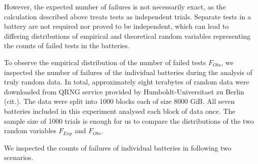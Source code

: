 \documentclass[
  digital,  	%
  color,		%
  oneside,   	%
  12pt,
  nocover,
  notable,
  nolof,
  nolot,
]{fithesis3}
\theoremstyle{definition}
\theoremstyle{remark}
\begin{document}
However, the expected number of failures is not necessarily exact, as the calculation described above treats tests as independent trials. Separate tests in a battery are not required nor proved to be independent, which can lead to differing distributions of empirical and theoretical random variables representing the counts of failed tests in the batteries.

To observe the empirical distribution of the number of failed tests $F_{Obs}$, we inspected the number of failures of the individual batteries during the analysis of truly random data. In total, approximately eight terabytes of random data were downloaded from QRNG service provided by Humboldt-Universitaet zu Berlin (cit.). The data were split into 1000 blocks each of size 8000 GiB. All seven batteries included in this experiment analysed each block of data once. The sample size of 1000 trials is enough for us to compare the distributions of the two random variables $F_{Exp}$ and $F_{Obs}$.

We inspected the counts of failures of individual batteries in following two scenarios.
\end{document}

